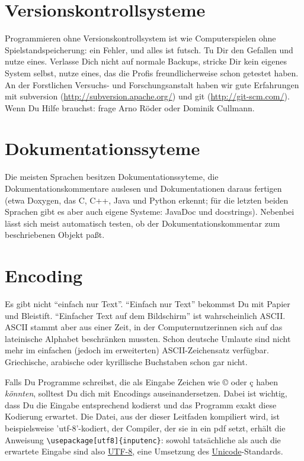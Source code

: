 \documentclass[twoside]{scrreprt}
\providecommand{\FVA}[1]{Forstliche#1 Versuchs- und Forschungs\-anstalt}
\begin{document}
\section{Versionskontrollsysteme\label{sec:vcs}}
Programmieren ohne Versionskontrollsystem ist wie Computerspielen ohne
Spielstandspeicherung: ein Fehler, und alles ist futsch.
Tu Dir den Gefallen und nutze eines.
Verlasse Dich nicht auf normale Backups, stricke Dir kein eigenes System selbst,
nutze eines, das die Profis freundlicherweise schon getestet haben.
An der \FVA{n} haben wir gute Erfahrungen mit
subversion (\url{http://subversion.apache.org/})
und git (\url{http://git-scm.com/}).
Wenn Du Hilfe brauchst: frage Arno R\"o{}der oder Dominik Cullmann. 

\section{Dokumentationssyteme\label{sec:doxygen}}
Die meisten Sprachen besitzen Dokumentationssyteme, die Dokumentationskommentare
auslesen und Dokumentationen daraus fertigen (etwa Doxygen, das C, C++, Java und
Python erkennt; f\"u{}r die letzten beiden Sprachen gibt es aber auch eigene
Systeme: JavaDoc und docstrings).
Nebenbei l\"a{}sst sich meist automatisch testen, ob der
Dokumentationskommentar zum beschriebenen Objekt pa\ss{}t.

\section{Encoding}
Es gibt nicht "`einfach nur Text"'. "`Einfach nur Text"' bekommst Du mit Papier
und Bleistift. "`Einfacher Text auf dem Bildschirm"' ist wahrscheinlich
ASCII. ASCII stammt aber aus einer Zeit, in der Computernutzerinnen sich auf das
lateinische Alphabet beschr\"a{}nken mussten. 
Schon deutsche Umlaute sind nicht
mehr im einfachen (jedoch im erweiterten) ASCII-Zeichensatz verf\"u{}gbar.
Griechische, arabische oder kyrillische Buchstaben schon gar nicht.


Falls Du Programme schreibst, die als Eingabe Zeichen wie ©  oder ç haben
\emph{k\"o{}nnten}, solltest Du dich mit Encodings auseinandersetzen. Dabei
ist wichtig, dass Du die Eingabe entsprechend kodierst und das Programm exakt
diese Kodierung erwartet. Die Datei, aus der dieser Leitfaden kompiliert
wird, ist beispielsweise 'utf-8'-kodiert, der Compiler, der sie in ein pdf
setzt, erh\"a{}lt die Anweisung \verb+\usepackage[utf8]{inputenc}+: sowohl
tats\"a{}chliche als auch die erwartete Eingabe sind also
\href{http://en.wikipedia.org/wiki/UTF-8}{UTF-8}, eine Umsetzung des
\href{http://en.wikipedia.org/wiki/Unicode}{Unicode}-Standards.
\end{document}
